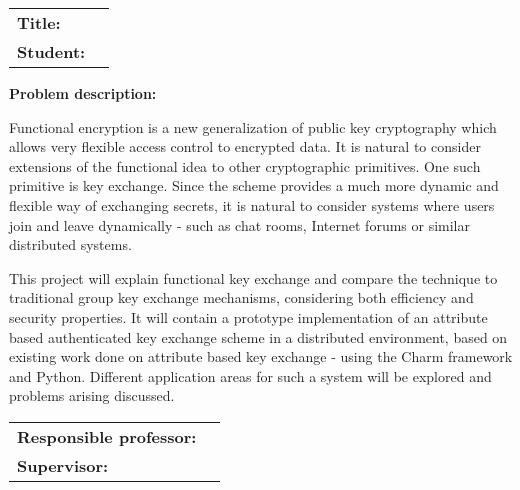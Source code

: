 \noindent
\begin{tabular}{@{}p{4cm}l}
\textbf{Title:} 	& \thetitle \\
\textbf{Student:}	& \theauthor \\
\end{tabular}

\vspace{4ex}
\noindent\textbf{Problem description:}


Functional encryption is a new generalization of public key cryptography which allows very flexible access
control to encrypted data. It is natural to consider extensions of the functional idea to other cryptographic
primitives. One such primitive is key exchange. 
Since the scheme provides a much more dynamic and flexible way of exchanging secrets, it is natural to consider systems where users join and leave dynamically - such as chat rooms, Internet forums or similar distributed systems. 

This project will explain functional key exchange and compare the technique to traditional group key exchange mechanisms, considering both efficiency and security properties. It will contain a prototype implementation of an attribute based authenticated key exchange scheme in a distributed environment, based on existing work done on attribute based key exchange - using the Charm framework and Python. Different application areas for such a system will be explored and problems arising discussed.

\noindent
\begin{tabular}{@{}p{4cm}l}
\textbf{Responsible professor:} 	& \theprofessor \\
\textbf{Supervisor:}			& \thesupervisor \\
\end{tabular}
